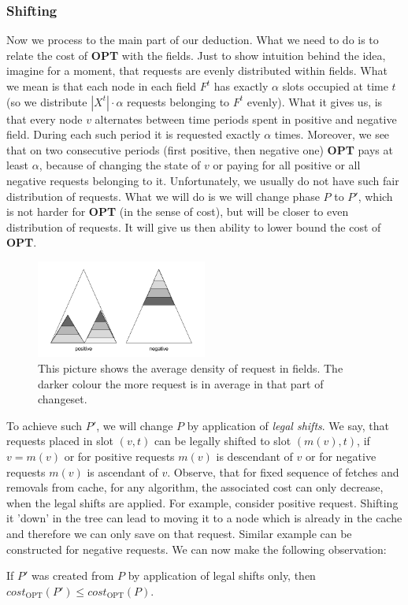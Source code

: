 \subsubsection{Shifting}
Now we process to the main part of our deduction. What we need to do is to 
relate the cost of \textbf{OPT} with the fields. Just to show intuition behind the 
idea, imagine 
for a moment, that requests are evenly distributed within fields. What we mean
is that each node in each field $F^t$ has exactly $\alpha$ slots 
occupied at time $t$ (so we distribute $|X^t| \cdot \alpha$ requests belonging 
to $F^t$ evenly). What it gives us, is that every node $v$ alternates between 
time periods spent in positive and negative field. During each such period it is 
requested exactly $\alpha$ times. Moreover, we see that on two consecutive 
periods (first positive, then negative one) \textbf{OPT} pays at least $\alpha$, 
because of changing 
the state of $v$ or paying for all positive or all negative requests belonging to it. 
Unfortunately, we usually do not have such fair distribution of requests. What we 
will do is 
we will change phase $P$ to $P'$, which is not harder for \textbf{OPT} (in the sense
of cost), but will be closer to even distribution of requests. It will give us then 
ability to lower bound the cost of \textbf{OPT}.
\begin{figure}
\vspace{-20pt}
 \begin{center}
  \includegraphics[width=0.5\textwidth]{density_pic.png}
\end{center}
\caption{This picture shows the average density of request in fields. The 
darker colour the more request is in average in that part of changeset.}
\vspace{-10pt}
\label{fig:density}
\end{figure}

To achieve such $P'$, we will change $P$ by application of \textit{legal shifts}. 
We say, that requests placed in slot $(v, t)$ can be legally shifted to slot $(m(v), t)$,
if $v = m(v)$ or for positive requests $m(v)$ is descendant of $v$ or for negative 
requests $m(v)$ is ascendant of $v$. Observe, that for fixed sequence of fetches 
and removals from cache, for any algorithm, the associated cost can only decrease, 
when the legal shifts are applied. For example, consider positive request. 
Shifting it 'down' in the tree can lead to moving it to a node which is already 
in the cache and therefore we can only save on that request. Similar example can 
be constructed for negative requests. We can now make the following observation:
\begin{observe}
If $P'$ was created from $P$ by application of legal shifts only, then 
$cost_{\mathrm{OPT}}(P') \leq cost_{\mathrm{OPT}}(P)$.
\end{observe}

